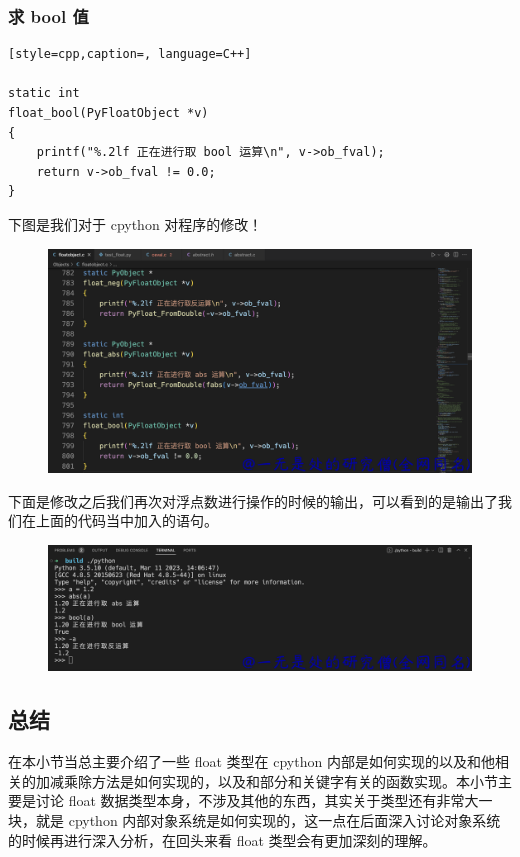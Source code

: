 \subsubsection{求 bool 值}
\begin{lstlisting}[style=cpp,caption=, language=C++]

static int
float_bool(PyFloatObject *v)
{
    printf("%.2lf 正在进行取 bool 运算\n", v->ob_fval);
    return v->ob_fval != 0.0;
}
\end{lstlisting}
下图是我们对于 cpython 对程序的修改！

    \begin{figure}[h]
        \centering
            \includegraphics[scale=.12]{images/14-float.png}
            \caption{ }
        \label{fig:my_label}
    \end{figure}
    
下面是修改之后我们再次对浮点数进行操作的时候的输出，可以看到的是输出了我们在上面的代码当中加入的语句。

    \begin{figure}[h]
        \centering
            \includegraphics[scale=.2]{images/13-float.png}
            \caption{ }
        \label{fig:my_label}
    \end{figure}
    
\subsection{总结}
在本小节当总主要介绍了一些 float 类型在 cpython 内部是如何实现的以及和他相关的加减乘除方法是如何实现的，以及和部分和关键字有关的函数实现。本小节主要是讨论 float 数据类型本身，不涉及其他的东西，其实关于类型还有非常大一块，就是 cpython 内部对象系统是如何实现的，这一点在后面深入讨论对象系统的时候再进行深入分析，在回头来看 float 类型会有更加深刻的理解。
